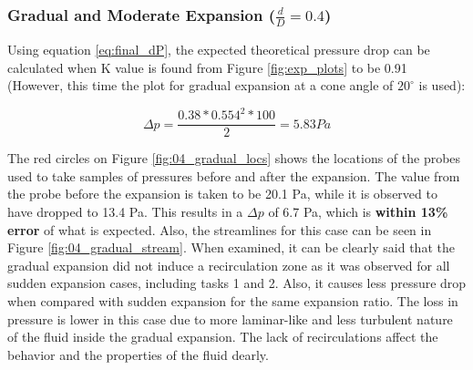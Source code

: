 \subsubsection{Gradual and Moderate Expansion ($\frac{d}{D} = 0.4$)}

Using equation \ref{eq:final_dP}, the expected theoretical pressure drop can be calculated when K value is found from Figure \ref{fig:exp_plots} to be 0.91 (However, this time the plot for gradual expansion at a cone angle of $20^{\circ}$ is used):

\[\Delta p = \frac{0.38 * 0.554^2 * 100}{2} = 5.83Pa \]


\noindent The red circles on Figure \ref{fig:04_gradual_locs} shows the locations of the probes used to take samples of pressures before and after the expansion. The value from the probe before the expansion is taken to be 20.1 Pa, while it is observed to have dropped to 13.4 Pa. This results in a $\Delta p$ of 6.7 Pa, which is \textbf{within 13\% error} of what is expected. Also, the streamlines for this case can be seen in Figure \ref{fig:04_gradual_stream}. When examined, it can be clearly said that the gradual expansion did not induce a recirculation zone as it was observed for all sudden expansion cases, including tasks 1 and 2. Also, it causes less pressure drop when compared with sudden expansion for the same expansion ratio. The loss in pressure is lower in this case due to more laminar-like and less turbulent nature of the fluid inside the gradual expansion. The lack of recirculations affect the behavior and the properties of the fluid dearly.

